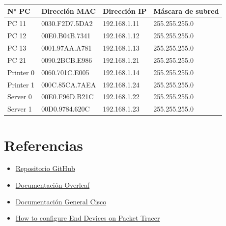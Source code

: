 \documentclass{article}
\begin{document}
    \begin{center}
        \begin{tabular}{| p{3cm} | p{4.1cm} | p{4.1cm} | p{4.1cm} |}
            \hline
            {\bfseries N° PC} & {\bfseries Dirección MAC} & {\bfseries Dirección IP} & {\bfseries Máscara de subred} \\\hline
            PC 11 & 0030.F2D7.5DA2 & 192.168.1.11 & 255.255.255.0 \\\hline
            PC 12 & 00E0.B04B.7341 & 192.168.1.12 & 255.255.255.0 \\\hline
            PC 13 & 0001.97AA.A781 & 192.168.1.13 & 255.255.255.0 \\\hline
            PC 21 & 0090.2BCB.E986 & 192.168.1.21 & 255.255.255.0 \\\hline
            Printer 0 & 0060.701C.E005 & 192.168.1.14 & 255.255.255.0 \\\hline
            Printer 1 & 000C.85CA.7AEA & 192.168.1.24 & 255.255.255.0 \\\hline
            Server 0 & 00E0.F96D.B21C & 192.168.1.22 & 255.255.255.0 \\\hline
            Server 1 & 00D0.9784.620C & 192.168.1.23 & 255.255.255.0 \\\hline
        \end{tabular}
    \end{center} 

    \pagebreak
    \section{Referencias}
        \begin{itemize}
            \item \href{https://github.com/MarianC312/Laboratorio_1_Hubs}{Repositorio GitHub}
            \item \href{https://www.overleaf.com/learn}{Documentación Overleaf}
            \item \href{https://community.cisco.com/t5/documentos-general/tkb-p/5761-docs-general}{Documentación General Cisco}
            \item \href{https://www.geeksforgeeks.org/how-to-configure-end-devices-on-packet-tracer/}{How to configure End Devices on Packet Tracer}
        \end{itemize}
\end{document}
